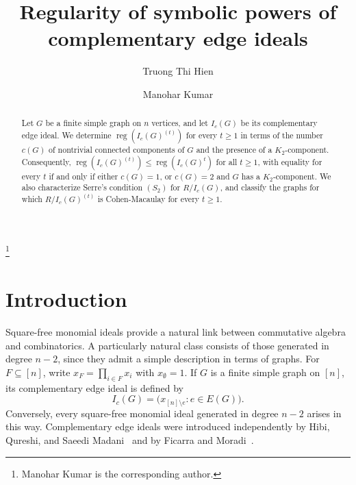 \documentclass[12pt]{amsart}
\DeclareMathOperator{\reg}{reg}
\begin{document}
	
	
\title[Regularity of symbolic powers of complementary  edges ideals]{Regularity of symbolic powers of \\ complementary  edge ideals}


    
    \author[Truong Thi Hien]{Truong Thi Hien}
	\address{Faculty of Natural Sciences, Hong Duc University, No. 565 Quang Trung, Hac Thanh, Thanh Hoa, Vietnam}
	
	
    
    \author[Manohar Kumar]{Manohar Kumar}
	\address{Department of Mathematics, Indian Institute of Technology Madras, Chennai 600036, India}
	
	
	
	\thanks{Manohar Kumar is the corresponding author.}
	



\begin{abstract}
Let \(G\) be a finite simple graph on \(n\) vertices, and let \(I_c(G)\) be its complementary edge ideal. We determine \(\reg(I_c(G)^{(t)})\) for every \(t\geq1\) in terms of the number \(c(G)\) of nontrivial connected components of \(G\) and the presence of a \(K_2\)-component. Consequently, \(\reg(I_c(G)^{(t)})\leq \reg(I_c(G)^t) \)
for all \(t\geq1\), with equality for every \(t\) if and only if either \(c(G)=1\), or \(c(G)=2\) and \(G\) has a \(K_2\)-component. We also characterize Serre's condition \((S_2)\) for \(R/I_c(G)\), and classify the graphs for which \(R/I_c(G)^{(t)}\) is Cohen-Macaulay for every \(t\geq1\).
\end{abstract}


	\maketitle



\section{Introduction}

Square-free monomial ideals provide a natural link between commutative algebra and combinatorics. A particularly natural class consists of those generated in degree \(n-2\), since they admit a simple description in terms of graphs.  For \(F\subseteq[n]\), write \(x_F=\prod_{i\in F}x_i\) with \(x_\emptyset=1\). If \(G\) is a finite simple graph on \([n]\), its complementary edge ideal is defined by
\[
I_c(G)=\bigl(x_{[n]\setminus e}:e\in E(G)\bigr).
\]
Conversely, every square-free monomial ideal generated in degree \(n-2\) arises in this way. Complementary edge ideals were introduced independently by Hibi, Qureshi, and Saeedi Madani~\cite{HQSM26} and by Ficarra and Moradi~\cite{fm25}.
\end{document}
